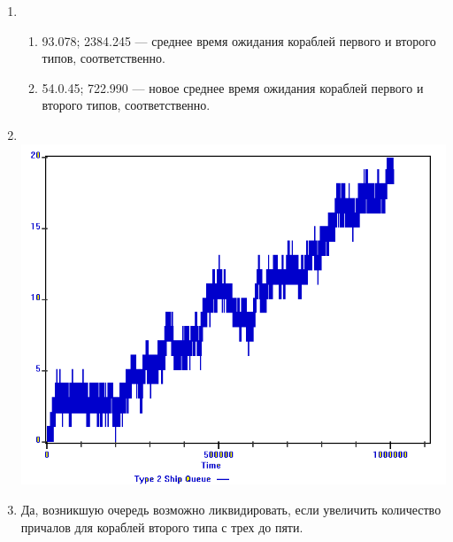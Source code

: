 \documentclass[12pt]{article}
\begin{document}
\begin{enumerate}
	\item \mbox{} \\
	      \begin{enumerate}
		      \item 93.078; 2384.245 ---
		            среднее время ожидания кораблей первого и второго типов, соответственно.
		      \item 54.0.45; 722.990 ---
		            новое среднее время ожидания кораблей первого и второго типов, соответственно.
	      \end{enumerate}
	\item \mbox{} \\
	      \includegraphics[scale=0.7]{plot.png}
	\item Да, возникшую очередь возможно ликвидировать,
	      если увеличить количество причалов для кораблей второго типа с трех до пяти.

\end{enumerate}
\end{document}
